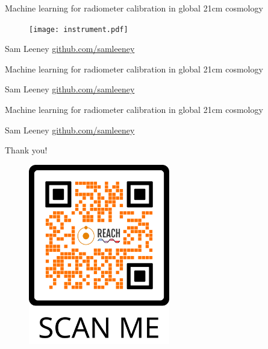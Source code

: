 \documentclass{beamer}
\begin{document}
\begin{frame}{\small{Machine learning for radiometer calibration in global 21cm cosmology}}
  \begin{figure}
    \centering
    \texttt{[image: instrument.pdf]}
  \end{figure}
\vfill
\tiny{Sam Leeney \hfill \href{https://github.com/samleeney}{github.com/samleeney}}
\end{frame}

\begin{frame}{\small{Machine learning for radiometer calibration in global 21cm cosmology}}
  \begin{figure}
    \centering
    
  \end{figure}
\vfill
\tiny{Sam Leeney \hfill \href{https://github.com/samleeney}{github.com/samleeney}}
\end{frame}

\begin{frame}{\small{Machine learning for radiometer calibration in global 21cm cosmology}}
  \begin{figure}
    \centering
    
  \end{figure}

  \begin{figure}
    \centering
    
  \end{figure}
\vfill
\tiny{Sam Leeney \hfill \href{https://github.com/samleeney}{github.com/samleeney}}
\end{frame}

\begin{frame}{\small{Thank you!}}
  \begin{figure}
    \centering
    \includegraphics[width=0.55\textwidth]{qr.png}
  \end{figure}
\end{frame}
\end{document}
